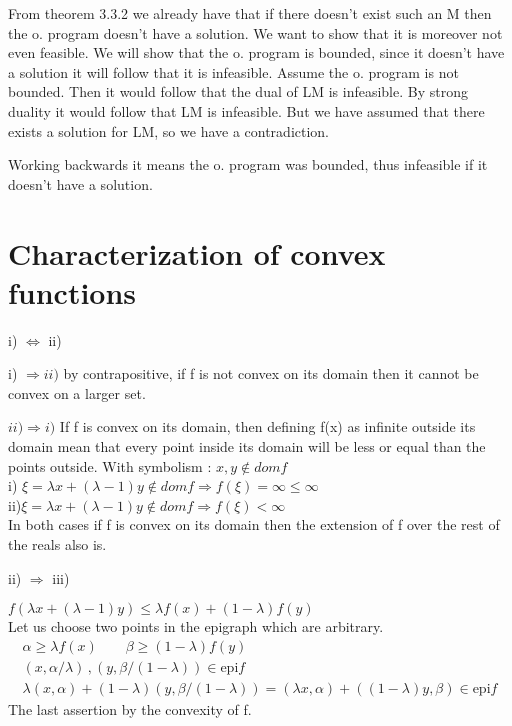 \documentclass{article}
\begin{document}
	 From theorem 3.3.2 we already have that if there doesn't exist such an M then the o. program doesn't have a solution. We want to show that it is moreover not even feasible. We will show that the o. program is bounded, since it doesn't have a solution it will follow that it is infeasible. Assume the o. program is not bounded. Then it would follow that the dual of LM is infeasible. By strong duality it would follow that LM is infeasible. But we have assumed that there exists a solution for LM, so we have a contradiction. 
	 
	 Working backwards it means the o. program was bounded, thus infeasible if it doesn't have a solution.
	
	
	\clearpage
	
	\section{Characterization of convex functions}
	
	i) $\iff$ ii)
	
	i) $\Rightarrow ii)$ by contrapositive, if f is not convex on its domain then it cannot be convex on a larger set. 
	
	$ii) \Rightarrow i)$ If f is convex on its domain, then defining f(x) as infinite outside its domain mean that every point inside its domain will be less or equal than the points outside. With symbolism : $x, y \notin  dom  f$\\
	i) $ \xi = \lambda x +(\lambda-1)y \notin dom f \Rightarrow f(\xi) = \infty \leq \infty $ \\
	ii)$ \xi = \lambda x +(\lambda-1)y \notin dom f \Rightarrow f(\xi) < \infty $\\
	In both cases if f is convex on its domain then the extension of f over the rest of the reals also is.
	\vspace{1cm}
	
	ii) $\Rightarrow$ iii) 
	
	$f(\lambda x + (\lambda - 1)y) \leq \lambda f(x) + (1-\lambda ) f(y)$\\
	Let us choose two points in the epigraph which are arbitrary.
	\begin{align}
		\alpha \geq \lambda f(x) \qquad \beta \geq (1-\lambda)f(y)\\[2ex]
		(x,\alpha/\lambda) \, ,  (y,\beta /(1-\lambda)) \in \mathrm{epi} f\\[2ex]
		\lambda (x,\alpha) + (1-\lambda)(y, \beta /(1-\lambda )) = (\lambda x, \alpha)  + ((1-\lambda)y, \beta) \in \mathrm{epi} f 
	\end{align}
	The last assertion by the convexity of f. 
	
\end{document}
